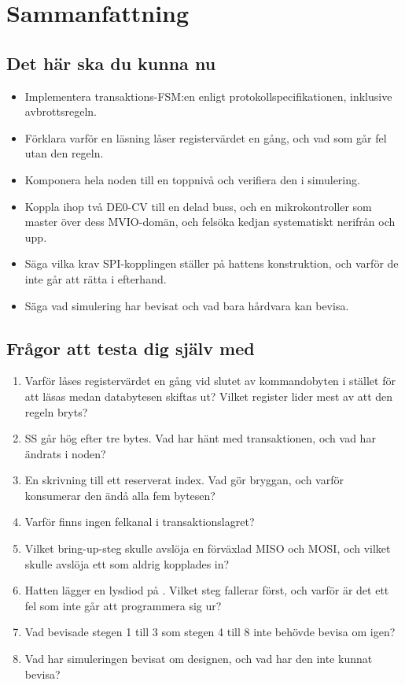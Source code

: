
\section{Sammanfattning}
\label{c19:sec:review}

\subsection*{Det här ska du kunna nu}
\begin{itemize}
  \item Implementera transaktions-FSM:en enligt protokollspecifikationen, inklusive avbrottsregeln.
  \item Förklara varför en läsning låser registervärdet en gång, och vad som går fel utan den regeln.
  \item Komponera hela noden till en toppnivå och verifiera den i simulering.
  \item Koppla ihop två DE0-CV till en delad buss, och en mikrokontroller som master över dess
    MVIO-domän, och felsöka kedjan systematiskt nerifrån och upp.
  \item Säga vilka krav SPI-kopplingen ställer på hattens konstruktion, och varför de inte går att
    rätta i efterhand.
  \item Säga vad simulering har bevisat och vad bara hårdvara kan bevisa.
\end{itemize}

\subsection*{Frågor att testa dig själv med}
\begin{enumerate}
  \item Varför låses registervärdet en gång vid slutet av kommandobyten i stället för att läsas medan
    databytesen skiftas ut? Vilket register lider mest av att den regeln bryts?
  \item SS går hög efter tre bytes. Vad har hänt med transaktionen, och vad har ändrats i noden?
  \item En skrivning till ett reserverat index. Vad gör bryggan, och varför konsumerar den ändå alla
    fem bytesen?
  \item Varför finns ingen felkanal i transaktionslagret?
  \item Vilket bring-up-steg skulle avslöja en förväxlad MISO och MOSI, och vilket skulle avslöja ett
     som aldrig kopplades in?
  \item Hatten lägger en lysdiod på . Vilket steg fallerar först, och varför är det ett fel
    som inte går att programmera sig ur?
  \item Vad bevisade stegen 1 till 3 som stegen 4 till 8 inte behövde bevisa om igen?
  \item Vad har simuleringen bevisat om designen, och vad har den inte kunnat bevisa?
\end{enumerate}

